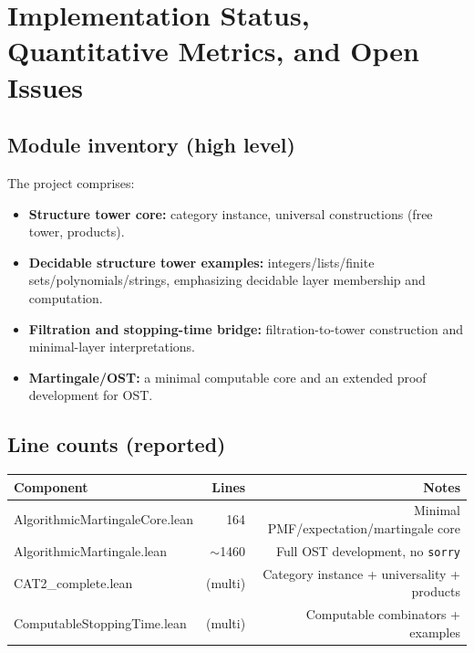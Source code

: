 \documentclass[11pt]{article}
\begin{document}
\section{Implementation Status, Quantitative Metrics, and Open Issues}
\subsection{Module inventory (high level)}
The project comprises:
\begin{itemize}[leftmargin=1.2em]
\item \textbf{Structure tower core:} category instance, universal constructions (free tower, products).
\item \textbf{Decidable structure tower examples:} integers/lists/finite sets/polynomials/strings, emphasizing decidable layer membership and computation.
\item \textbf{Filtration and stopping-time bridge:} filtration-to-tower construction and minimal-layer interpretations.
\item \textbf{Martingale/OST:} a minimal computable core and an extended proof development for OST.
\end{itemize}

\subsection{Line counts (reported)}
\begin{center}
\begin{tabular}{@{}lrr@{}}
\toprule
Component & Lines & Notes\\
\midrule
AlgorithmicMartingaleCore.lean & 164 & Minimal PMF/expectation/martingale core\\
AlgorithmicMartingale.lean & $\sim$1460 & Full OST development, no \texttt{sorry}\\
CAT2\_complete.lean & (multi) & Category instance + universality + products\\
ComputableStoppingTime.lean & (multi) & Computable combinators + examples\\
\bottomrule
\end{tabular}
\end{center}
\end{document}
